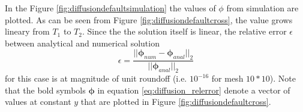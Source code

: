 \documentclass[]{article}
\begin{document}
In the Figure \ref{fig:diffusiondefaultsimulation} the values of $ \phi $ from simulation are plotted. As can be seen from Figure \ref{fig:diffusiondefaultcross}, the value grows lineary from $ T_1 $ to $ T_2 $. Since the the solution itself is linear, the relative error $ \epsilon $ between analytical and numerical solution
\begin{equation}\label{eq:diffusion_relerror}
\epsilon  = \dfrac{||\boldsymbol{\phi}_{num}-\boldsymbol{\phi}_{anal}||_2}{||\boldsymbol{\phi}_{anal}||_2}
\end{equation}
for this case is at magnitude of unit roundoff (i.e. $ 10^{-16} $ for mesh $ 10*10 $). Note that the bold symbols $ \boldsymbol{\phi} $ in equation \ref{eq:diffusion_relerror} denote a vector of values at constant $ y $ that are plotted in Figure \ref{fig:diffusiondefaultcross}.
\end{document}

